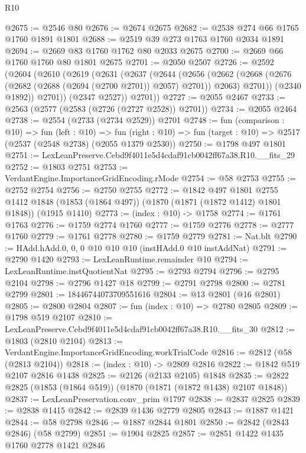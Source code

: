\begin{lexlean}{R10}
\begin{coremodule}
@2675 := @2546 @80
@2676 := @2674 @2675
@2682 := @2538 @274 @66 @1765 @1760 @1891 @1801
@2688 := @2519 @39 @273 @1763 @1760 @2034 @1891
@2694 := @2669 @83 @1760 @1762 @80 @2033 @2675
@2700 := @2669 @66 @1760 @1760 @80 @1801 @2675
@2701 := @2050 @2507
@2726 := @2592
    (@2604
      (@2610
        (@2619
          (@2631
            (@2637
              (@2644
                (@2656
                  (@2662
                    (@2668 (@2676 (@2682 (@2688 (@2694 (@2700 @2701)) @2057) @2701)) @2063)
                    @2701))
                (@2340 @1892))
              @2701))
          (@2347 @2527))
        @2701))
@2727 := @2055 @2467
@2733 := @2563 (@2577 (@2583 (@2726 (@2727 @2528)) @2701))
@2734 := @2055 @2464
@2738 := @2554 (@2733 (@2734 @2529)) @2701
@2748 := fun (comparison : @10) =>
  fun (left : @10) =>
  fun (right : @10) => fun (target : @10) => @2517 (@2537 (@2548 @2738) (@2055 @1379 @2530))
@2750 := @1798 @497 @1801
@2751 := LexLeanPreserve.Cebd9f4011e5d4cdaf91cb0042ff67a38.R10.__fits_29
@2752 := @1803 @2751
@2753 := VerdantEngine.ImportanceGridEncoding.rMode
@2754 := @58 @2753
@2755 := @2752 @2754
@2756 := @2750 @2755
@2772 := @1842
    @497
    @1801
    @2755
    @1412
    @1848
    (@1853 (@1864 @497))
    (@1870 (@1871 (@1872 @1412) @1801 @1848))
    (@1915 @1410)
@2773 := (index : @10) -> @1758
@2774 := @1761 @1763
@2776 := @1759 @2774 @1760
@2777 := @1759 @2776
@2778 := @2777 @1760
@2779 := @1761 @2778
@2780 := @1759 @2779
@2781 := Nat.blt
@2790 := HAdd.hAdd.{0, 0, 0} @10 @10 @10 (instHAdd.{0} @10 instAddNat)
@2791 := @2790 @1420
@2793 := LexLeanRuntime.remainder @10
@2794 := LexLeanRuntime.instQuotientNat
@2795 := @2793 @2794
@2796 := @2795 @2104
@2798 := @2796 @1427 @18
@2799 := @2791 @2798
@2800 := @2781 @2799
@2801 := 18446744073709551616
@2804 := @13 @2801 (@16 @2801)
@2805 := @2800 @2804
@2807 := fun (index : @10) => @2780 @2805
@2809 := @1798 @519 @2107
@2810 := LexLeanPreserve.Cebd9f4011e5d4cdaf91cb0042ff67a38.R10.__fits_30
@2812 := @1803 (@2810 @2104)
@2813 := VerdantEngine.ImportanceGridEncoding.workTrialCode
@2816 := @2812 (@58 (@2813 @2104))
@2818 := (index : @10) -> @2809 @2816
@2822 := @1842 @519 @2107 @2816 @1438
@2825 := @2126 (@2133 @2105) @1848
@2835 := @2822 @2825 (@1853 (@1864 @519)) (@1870 (@1871 (@1872 @1438) @2107 @1848))
@2837 := LexLeanPreservation.conv_prim @1797
@2838 := @2837 @2825
@2839 := @2838 @1415
@2842 := @2839 @1436 @2779 @2805
@2843 := @1887 @1421
@2844 := @58 @2798
@2846 := @1887 @2844 @1801
@2850 := @2842 (@2843 @2846) (@58 @2799)
@2851 := @1904 @2825
@2857 := @2851 @1422 @1435 @1760 @2778 @1421 @2846

\end{coremodule}
\end{lexlean}

